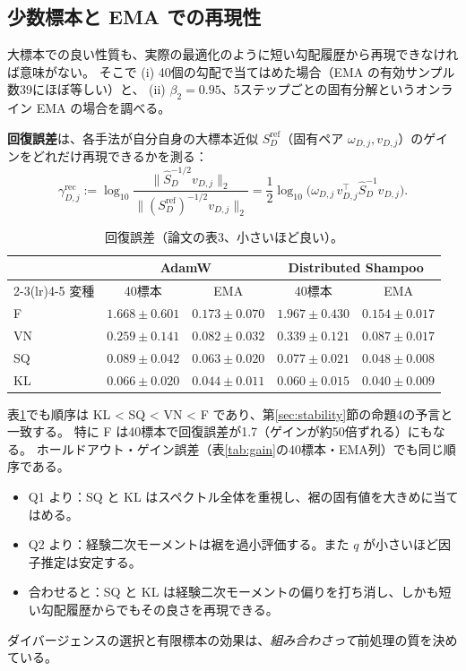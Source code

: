 \documentclass[a4paper,11pt]{ltjsarticle}
\theoremstyle{definition}
\theoremstyle{plain}
\newcommand{\norm}[1]{\lVert #1\rVert}
\newcommand{\T}{^{\top}}
\begin{document}
\subsection{少数標本と EMA での再現性}

大標本での良い性質も、実際の最適化のように短い勾配履歴から再現できなければ意味がない。
そこで (i) 40個の勾配で当てはめた場合（EMA の有効サンプル数39にほぼ等しい）と、
(ii) $\beta_2 = 0.95$、5ステップごとの固有分解というオンライン EMA の場合を調べる。

\textbf{回復誤差}は、各手法が自分自身の大標本近似 $S_D^{\mathrm{ref}}$（固有ペア $\omega_{D,j}, v_{D,j}$）のゲインをどれだけ再現できるかを測る：
\begin{equation}
  \gamma^{\mathrm{rec}}_{D,j} := \log_{10}\frac{\norm{\widehat S_D^{-1/2}v_{D,j}}_2}{\norm{(S_D^{\mathrm{ref}})^{-1/2}v_{D,j}}_2}
  = \frac12\log_{10}\bigl(\omega_{D,j}\,v_{D,j}\T\widehat S_D^{-1}v_{D,j}\bigr).
\end{equation}

\begin{table}[t]
\centering
\caption{回復誤差（論文の表3、小さいほど良い）。}
\label{tab:recovery}
\begin{tabular}{lcccc}
\toprule
 & \multicolumn{2}{c}{AdamW} & \multicolumn{2}{c}{Distributed Shampoo}\\
\cmidrule(lr){2-3}\cmidrule(lr){4-5}
変種 & 40標本 & EMA & 40標本 & EMA\\\midrule
F  & $1.668\pm0.601$ & $0.173\pm0.070$ & $1.967\pm0.430$ & $0.154\pm0.017$\\
VN & $0.259\pm0.141$ & $0.082\pm0.032$ & $0.339\pm0.121$ & $0.087\pm0.017$\\
SQ & $0.089\pm0.042$ & $0.063\pm0.020$ & $0.077\pm0.021$ & $0.048\pm0.008$\\
KL & $\mathbf{0.066\pm0.020}$ & $\mathbf{0.044\pm0.011}$ & $\mathbf{0.060\pm0.015}$ & $\mathbf{0.040\pm0.009}$\\
\bottomrule
\end{tabular}
\end{table}

表\ref{tab:recovery}でも順序は KL < SQ < VN < F であり、第\ref{sec:stability}節の命題4の予言と一致する。
特に F は40標本で回復誤差が1.7（ゲインが約50倍ずれる）にもなる。
ホールドアウト・ゲイン誤差（表\ref{tab:gain}の40標本・EMA列）でも同じ順序である。

\begin{pointbox}
\begin{itemize}
  \item Q1 より：SQ と KL はスペクトル全体を重視し、裾の固有値を大きめに当てはめる。
  \item Q2 より：経験二次モーメントは裾を過小評価する。また $q$ が小さいほど因子推定は安定する。
  \item 合わせると：SQ と KL は経験二次モーメントの偏りを打ち消し、しかも短い勾配履歴からでもその良さを再現できる。
\end{itemize}
ダイバージェンスの選択と有限標本の効果は、\emph{組み合わさって}前処理の質を決めている。
\end{pointbox}
\end{document}
